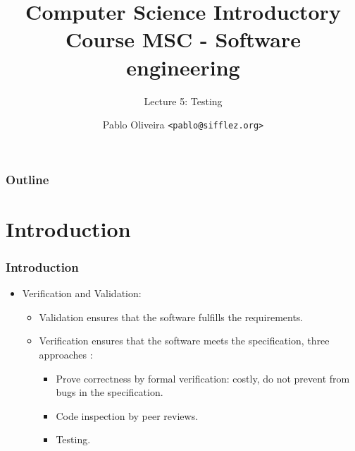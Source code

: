 \documentclass[10pt]{beamer}
\title{Computer Science Introductory Course MSC - Software engineering}
\subtitle{Lecture 5: Testing}
\author[Pablo Oliveira]{Pablo Oliveira \texttt{<pablo@sifflez.org>}}
\institute{ENST}
\date{}
\begin{document}
\begin{frame}
  \titlepage
\end{frame}

\begin{frame}
  \frametitle{Outline}
  \tableofcontents
\end{frame}

\section{Introduction}
\begin{frame}
\frametitle{Introduction}
\begin{itemize}
  \item Verification and Validation:
    \begin{itemize}
    \item Validation ensures that the software fulfills the requirements.
    \item \alert{Verification} ensures that the software meets the
      specification, three approaches :
      \begin{itemize}
      \item Prove correctness by formal verification: costly, do not prevent
        from bugs in the specification.
      \item Code inspection by peer reviews.
      \item \alert{Testing}.
      \end{itemize}
    \end{itemize}
\end{itemize}
\end{frame}
\end{document}
